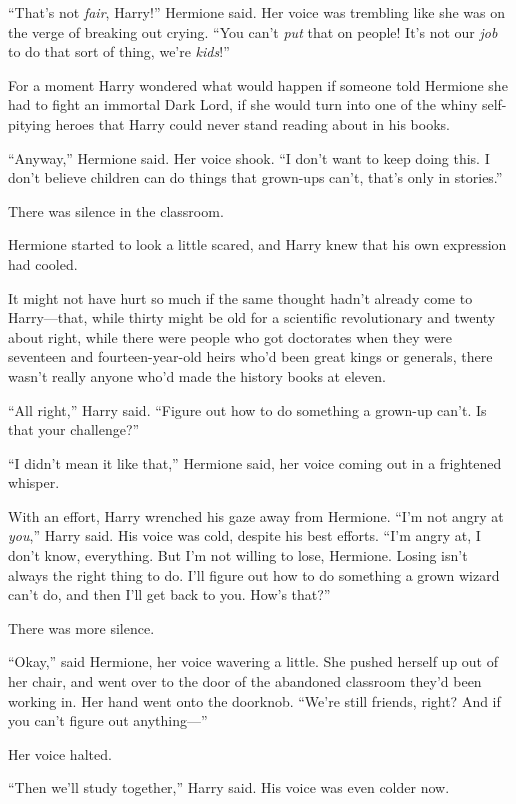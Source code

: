 “That’s not \emph{fair}, Harry!” Hermione said. Her voice was trembling like she was on the verge of breaking out crying. “You can’t \emph{put} that on people! It’s not our \emph{job} to do that sort of thing, we’re \emph{kids}!”

For a moment Harry wondered what would happen if someone told Hermione she had to fight an immortal Dark Lord, if she would turn into one of the whiny self-pitying heroes that Harry could never stand reading about in his books.

“Anyway,” Hermione said. Her voice shook. “I don’t want to keep doing this. I don’t believe children can do things that grown-ups can’t, that’s only in stories.”

There was silence in the classroom.

Hermione started to look a little scared, and Harry knew that his own expression had cooled.

It might not have hurt so much if the same thought hadn’t already come to Harry—that, while thirty might be old for a scientific revolutionary and twenty about right, while there were people who got doctorates when they were seventeen and fourteen-year-old heirs who’d been great kings or generals, there wasn’t really anyone who’d made the history books at eleven.

“All right,” Harry said. “Figure out how to do something a grown-up can’t. Is that your challenge?”

“I didn’t mean it like that,” Hermione said, her voice coming out in a frightened whisper.

With an effort, Harry wrenched his gaze away from Hermione. “I’m not angry at \emph{you},” Harry said. His voice was cold, despite his best efforts. “I’m angry at, I don’t know, everything. But I’m not willing to lose, Hermione. Losing isn’t always the right thing to do. I’ll figure out how to do something a grown wizard can’t do, and then I’ll get back to you. How’s that?”

There was more silence.

“Okay,” said Hermione, her voice wavering a little. She pushed herself up out of her chair, and went over to the door of the abandoned classroom they’d been working in. Her hand went onto the doorknob. “We’re still friends, right? And if you can’t figure out anything—”

Her voice halted.

“Then we’ll study together,” Harry said. His voice was even colder now.

